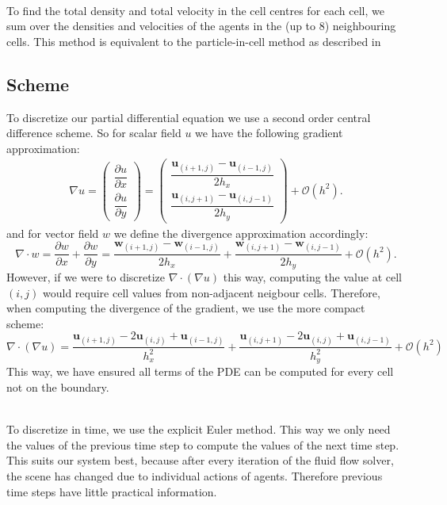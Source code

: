 \documentclass{article}
\renewcommand{\vec}[1]{\mathbf{#1}}
\newcommand{\bigo}[1]{\mathcal{O}\left(#1\right)}
\begin{document}
\ \\
To find the total density and total velocity in the cell centres for each cell, we sum over the densities and velocities of the agents in the (up to 8) neighbouring cells. This method is equivalent to the particle-in-cell method as described in \cite{zhu13}

\subsection{Scheme}
\label{sec:scheme}
To discretize our partial differential equation we use a second order central difference scheme. So for scalar field $u$ we have the following gradient approximation:
\begin{align*}
\nabla u=\begin{pmatrix}\dfrac{\partial u}{\partial x}\\\dfrac{\partial u}{\partial y}\end{pmatrix}
=\begin{pmatrix}\dfrac{\vec{u}_{(i+1,j)}-\vec{u}_{(i-1,j)}}{2h_x}\\\dfrac{\vec{u}_{(i,j+1)}-\vec{u}_{(i,j-1)}}{2h_y}\end{pmatrix}+\bigo{h^2}.
\end{align*}
and for vector field $w$ we define the divergence approximation accordingly:
\begin{equation}
\nabla\cdot w=\dfrac{\partial w}{\partial x}+\dfrac{\partial w}{\partial y}=\dfrac{\vec{w}_{(i+1,j)}-\vec{w}_{(i-1,j)}}{2h_x}+\dfrac{\vec{w}_{(i,j+1)}-\vec{w}_{(i,j-1)}}{2h_y}+\bigo{h^2}.
\end{equation}
However, if we were to discretize $\nabla\cdot(\nabla u)$ this way, computing the value at cell $(i,j)$ would require cell values from non-adjacent neigbour cells. Therefore, when computing the divergence of the gradient, we use the more compact scheme:
\begin{equation*}
\nabla\cdot(\nabla u) = \dfrac{\vec{u}_{(i+1,j)}-2\vec{u}_{(i,j)}+\vec{u}_{(i-1,j)}}{h_x^2}+\dfrac{\vec{u}_{(i,j+1)}-2\vec{u}_{(i,j)}+\vec{u}_{(i,j-1)}}{h_y^2}+\bigo{h^2}
\end{equation*}
This way, we have ensured all terms of the PDE can be computed for every cell not on the boundary.

\ \\
To discretize in time, we use the explicit Euler method. This way we only need the values of the previous time step to compute the values of the next time step. This suits our system best, because after every iteration of the fluid flow solver, the scene has changed due to individual actions of agents. Therefore previous time steps have little practical information.
\end{document}
